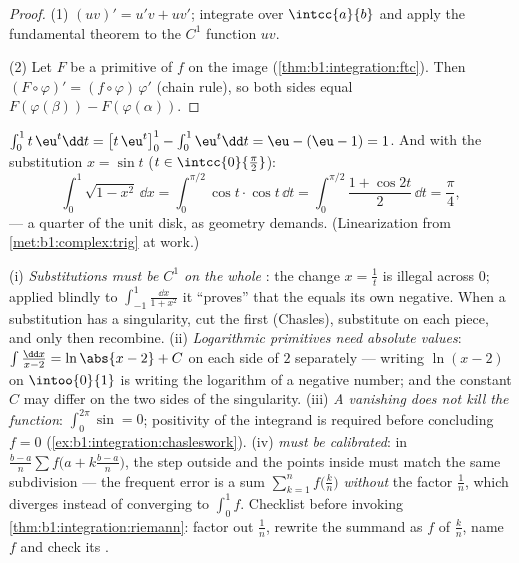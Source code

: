 \begin{proof}
(1) $(uv)' = u'v + uv'$; integrate over $\intcc{a}{b}$ and apply the
fundamental theorem to the $C^1$ function $uv$.

(2) Let $F$ be a primitive of $f$ on the image 
(\cref{thm:b1:integration:ftc}). Then $(F \circ \varphi)' = (f
\circ \varphi)\,\varphi'$ (chain rule), so both sides equal
$F(\varphi(\beta)) - F(\varphi(\alpha))$.
\end{proof}

\begin{example}\label{ex:b1:integration:parts}
$\int_0^1 t\,\eu^t \dd t = \bigl[t\,\eu^t\bigr]_0^1 - \int_0^1
\eu^t\dd t = \eu - (\eu - 1) = 1$. And with the substitution $x =
\sin t$ ($t \in \intcc{0}{\frac\pi2}$):
\[
\int_0^1 \sqrt{1 - x^2}\, \dd x
= \int_0^{\pi/2} \cos t \cdot \cos t \, \dd t
= \int_0^{\pi/2} \frac{1 + \cos 2t}{2}\, \dd t = \frac\pi4 ,
\]
--- a quarter of the unit disk, as geometry demands. (Linearization
from \cref{met:b1:complex:trig} at work.)
\end{example}

\begin{remark}
(i) \emph{Substitutions must be $C^1$ on the whole }:
the change $x = \frac1t$ is illegal across $0$; applied blindly
to $\int_{-1}^{1}\frac{\dd x}{1 + x^2}$ it ``proves'' that the
 equals its own negative. When a substitution has a
singularity, cut the  first (Chasles), substitute on
each piece, and only then recombine. (ii) \emph{Logarithmic
primitives need absolute values}: $\int \frac{\dd x}{x - 2} =
\ln\abs{x - 2} + C$ on each side of $2$ separately --- writing
$\ln(x - 2)$ on $\intoo{0}{1}$ is writing the logarithm of a
negative number; and the constant $C$ may differ on the two
sides of the singularity. (iii) \emph{A vanishing  does
not kill the function}: $\int_0^{2\pi}\sin = 0$; positivity of
the integrand is required before concluding $f = 0$
(\cref{ex:b1:integration:chasleswork}). (iv) \emph{
must be calibrated}: in $\frac{b-a}{n}\sum f\bigl(a +
k\frac{b-a}{n}\bigr)$, the step outside and the points inside
must match the same subdivision --- the frequent error is a sum
$\sum_{k=1}^{n} f\bigl(\frac kn\bigr)$ \emph{without} the factor
$\frac1n$, which diverges instead of converging to $\int_0^1
f$. Checklist before invoking \cref{thm:b1:integration:riemann}:
factor out $\frac1n$, rewrite the summand as $f$ of $\frac kn$,
name $f$ and check its .
\end{remark}

